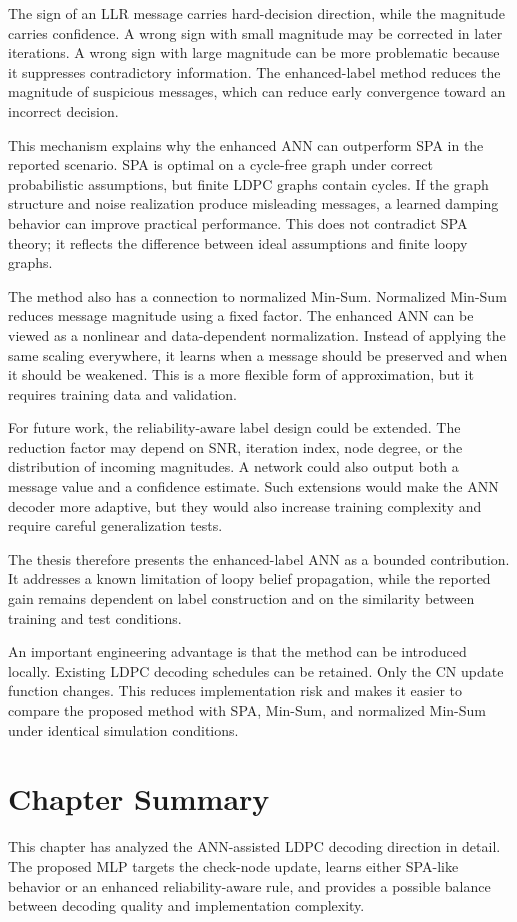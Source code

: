 The sign of an LLR message carries hard-decision direction, while the magnitude carries confidence. A wrong sign with small magnitude may be corrected in later iterations. A wrong sign with large magnitude can be more problematic because it suppresses contradictory information. The enhanced-label method reduces the magnitude of suspicious messages, which can reduce early convergence toward an incorrect decision.

This mechanism explains why the enhanced ANN can outperform SPA in the reported scenario. SPA is optimal on a cycle-free graph under correct probabilistic assumptions, but finite LDPC graphs contain cycles. If the graph structure and noise realization produce misleading messages, a learned damping behavior can improve practical performance. This does not contradict SPA theory; it reflects the difference between ideal assumptions and finite loopy graphs.

The method also has a connection to normalized Min-Sum. Normalized Min-Sum reduces message magnitude using a fixed factor. The enhanced ANN can be viewed as a nonlinear and data-dependent normalization. Instead of applying the same scaling everywhere, it learns when a message should be preserved and when it should be weakened. This is a more flexible form of approximation, but it requires training data and validation.

For future work, the reliability-aware label design could be extended. The reduction factor may depend on SNR, iteration index, node degree, or the distribution of incoming magnitudes. A network could also output both a message value and a confidence estimate. Such extensions would make the ANN decoder more adaptive, but they would also increase training complexity and require careful generalization tests.

The thesis therefore presents the enhanced-label ANN as a bounded contribution. It addresses a known limitation of loopy belief propagation, while the reported gain remains dependent on label construction and on the similarity between training and test conditions.

An important engineering advantage is that the method can be introduced locally. Existing LDPC decoding schedules can be retained. Only the CN update function changes. This reduces implementation risk and makes it easier to compare the proposed method with SPA, Min-Sum, and normalized Min-Sum under identical simulation conditions.

\section{Chapter Summary}
This chapter has analyzed the ANN-assisted LDPC decoding direction in detail. The proposed MLP targets the check-node update, learns either SPA-like behavior or an enhanced reliability-aware rule, and provides a possible balance between decoding quality and implementation complexity.

